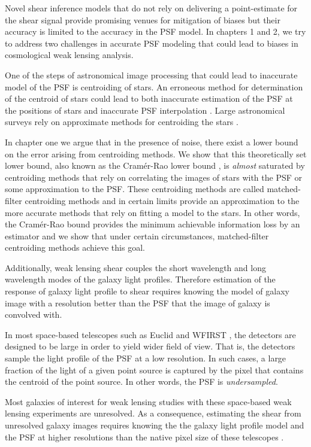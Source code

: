 Novel shear inference models that do not rely on delivering a point-estimate for the shear signal \citep{schneider,bernstein,huff,sheldon} 
provide promising venues for mitigation of biases but their accuracy is limited to the accuracy in the PSF model.
In chapters 1 and 2, we try to address two challenges in accurate PSF modeling that could lead to biases in cosmological weak lensing analysis. 

One of the steps of astronomical image processing that could lead to inaccurate model of the PSF is centroiding 
of stars. An erroneous method for determination of the centroid of stars could lead to both inaccurate estimation of the 
PSF at the positions of stars and inaccurate PSF interpolation \citep{anderson2000,sdss,anderson2003,desc}. Large astronomical surveys rely on approximate 
methods for centroiding the stars \citep{sextractor,sdss,des}. 

In chapter one we argue that in the presence of noise, there exist
a lower bound on the error arising from centroiding methods. We show that this theoretically set lower bound, also known as the Cram\'{e}r-Rao lower bound \citep{lecam}, 
is \emph{almost} saturated by centroiding methods that rely on correlating the images of stars with the PSF or some approximation to the 
PSF. These centroiding methods are called matched-filter centroiding methods and in certain limits provide an approximation to the more accurate 
methods that rely on fitting a model to the stars. In other words, the Cram\'{e}r-Rao bound provides the minimum achievable information loss by an estimator and 
we show that under certain circumstances, matched-filter centroiding methods achieve this goal.

Additionally, weak lensing shear couples the short wavelength and long wavelength modes of the galaxy light profiles. 
Therefore estimation of the response of galaxy light profile to shear requires knowing the model of galaxy image 
with a resolution better than the PSF that the image of galaxy is convolved with. 

In most space-based telescopes such as Euclid \citep{euclid} and WFIRST \citep{wfirst}, the detectors are designed to be large in order to yield wider field of view. 
That is, the detectors sample the light profile of the PSF at a low resolution. In such cases, a large fraction of the light of a given point source 
is captured by the pixel that contains the centroid of the point source. In other words, the PSF is \emph{undersampled}.

Most galaxies of interest for weak lensing studies with these space-based weak lensing experiments are unresolved. 
As a consequence, estimating the shear from unresolved galaxy images requires 
knowing the the galaxy light profile model and the PSF at higher resolutions than the native pixel size of these telescopes \citep{olic,ngole2}.

